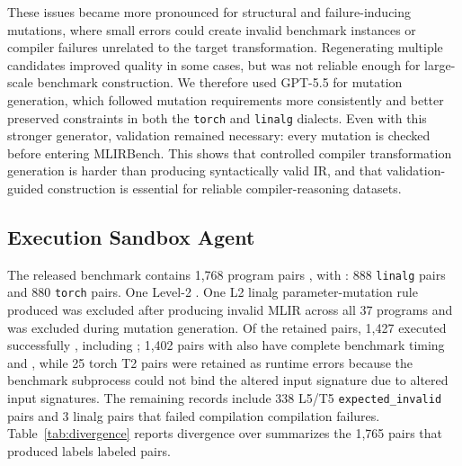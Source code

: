 \documentclass[sigplan,screen,review,anonymous]{acmart}
\providecommand{\DIFadd}[1]{{\protect\color{blue} \sf #1}} %
\providecommand{\DIFdel}[1]{{\protect\color{red} \scriptsize #1}} %
\providecommand{\DIFaddbegin}{} %
\providecommand{\DIFaddend}{} %
\providecommand{\DIFdelbegin}{} %
\providecommand{\DIFdelend}{} %
\begin{document}
These issues became more pronounced for structural and failure-inducing mutations, where small errors could create invalid benchmark instances or compiler failures unrelated to the target transformation. Regenerating multiple candidates improved quality in some cases, but was not reliable enough for large-scale benchmark construction. We therefore used GPT-5.5 for mutation generation, which followed mutation requirements more consistently and better preserved constraints in both the \texttt{torch} and \texttt{linalg} dialects. Even with this stronger generator, validation remained necessary: every mutation is checked before entering MLIRBench. This shows that controlled compiler transformation generation is harder than producing syntactically valid IR, and that validation-guided construction is essential for reliable compiler-reasoning datasets.

\subsection{Execution Sandbox Agent}
\label{sec:execution_experiments}

The released benchmark contains 1{,}768 program pairs\DIFdelbegin \DIFdel{, with }\DIFdelend \DIFaddbegin \DIFadd{: }\DIFaddend 888 \texttt{linalg}
\DIFdelbegin \DIFdel{pairs }\DIFdelend and 880 \texttt{torch}\DIFdelbegin \DIFdel{pairs. One Level-2 }\DIFdelend \DIFaddbegin \DIFadd{. One L2 }\DIFaddend linalg parameter-mutation rule \DIFdelbegin \DIFdel{produced }\DIFdelend \DIFaddbegin \DIFadd{was
excluded after producing }\DIFaddend invalid MLIR across all 37 programs\DIFdelbegin \DIFdel{and was excluded during mutation generation}\DIFdelend . Of the retained
pairs, 1{,}427 executed successfully\DIFdelbegin \DIFdel{, including }\DIFdelend \DIFaddbegin \DIFadd{; }\DIFaddend 1{,}402 \DIFdelbegin \DIFdel{pairs with }\DIFdelend \DIFaddbegin \DIFadd{also have }\DIFaddend complete benchmark
timing\DIFdelbegin \DIFdel{and }\DIFdelend \DIFaddbegin \DIFadd{, while }\DIFaddend 25 torch T2 pairs \DIFaddbegin \DIFadd{were }\DIFaddend retained as runtime errors \DIFdelbegin \DIFdel{because the benchmark subprocess could not bind the altered
input signature}\DIFdelend \DIFaddbegin \DIFadd{due to altered
input signatures}\DIFaddend . The remaining records include 338 L5/T5
\texttt{expected\_invalid} pairs and 3 linalg \DIFdelbegin \DIFdel{pairs that failed compilation }\DIFdelend \DIFaddbegin \DIFadd{compilation failures}\DIFaddend .
Table~\ref{tab:divergence} \DIFdelbegin \DIFdel{reports divergence over }\DIFdelend \DIFaddbegin \DIFadd{summarizes }\DIFaddend the 1{,}765 \DIFdelbegin \DIFdel{pairs that produced labels}\DIFdelend \DIFaddbegin \DIFadd{labeled pairs}\DIFaddend .
\end{document}
